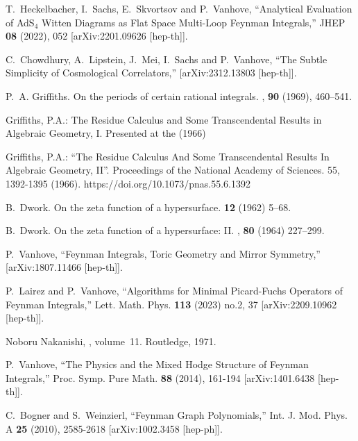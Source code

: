 \documentclass[a4paper,12pt]{article}
\numberwithin{equation}{section}
\numberwithin{figure}{section}
\begin{document}
\begin{thebibliography}{99}
T.~Heckelbacher, I.~Sachs, E.~Skvortsov and P.~Vanhove,
``Analytical Evaluation of AdS$_{4}$ Witten Diagrams as Flat Space Multi-Loop Feynman Integrals,''
JHEP \textbf{08} (2022), 052
[arXiv:2201.09626 [hep-th]].

C.~Chowdhury, A.~Lipstein, J.~Mei, I.~Sachs and P.~Vanhove,
``The Subtle Simplicity of Cosmological Correlators,''
[arXiv:2312.13803 [hep-th]].


P.~A. Griffiths.
\newblock On the periods of certain rational integrals.
, {\bf 90} (1969), 460--541.


   Griffiths, P.A.: The Residue Calculus and Some
    Transcendental Results in Algebraic Geometry, I. Presented at the
    (1966)

    Griffiths, P.A.: ``The Residue Calculus And Some Transcendental
    Results In Algebraic Geometry, II''. Proceedings of the National
    Academy of Sciences. 55, 1392-1395
    (1966). https://doi.org/10.1073/pnas.55.6.1392 

B.~Dwork.
\newblock On the zeta function of a hypersurface.
 {\bf 12} (1962) 5--68.

B.~Dwork.
\newblock On the zeta function of a hypersurface: {{II}}.
, {\bf 80} (1964) 227--299.
  
P.~Vanhove,
``Feynman Integrals, Toric Geometry and Mirror Symmetry,''
[arXiv:1807.11466 [hep-th]].
  
P.~Lairez and P.~Vanhove,
``Algorithms for Minimal Picard-Fuchs Operators of Feynman Integrals,''
Lett. Math. Phys. \textbf{113} (2023) no.2, 37
[arXiv:2209.10962 [hep-th]].



Noboru Nakanishi,
, volume~11.
\newblock Routledge, 1971.

  
P.~Vanhove,
``The Physics and the Mixed Hodge Structure of Feynman Integrals,''
Proc. Symp. Pure Math. \textbf{88} (2014), 161-194
[arXiv:1401.6438 [hep-th]].


C.~Bogner and S.~Weinzierl,
``Feynman Graph Polynomials,''
Int. J. Mod. Phys. A \textbf{25} (2010), 2585-2618
[arXiv:1002.3458 [hep-ph]].


\end{thebibliography}
\end{document}
